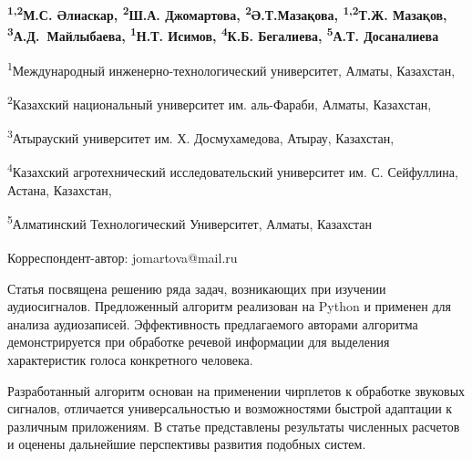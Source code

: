 
\begin{articleheader}

{\bfseries
\textsuperscript{1,2}М.С. Әлиаскар,
\textsuperscript{2}Ш.А. Джомартова\textsuperscript{\envelope },
\textsuperscript{2}Ә.Т.Мазақова,
\textsuperscript{1,2}Т.Ж. Мазақов,
\textsuperscript{3}А.Д.~Майлыбаева,
\textsuperscript{1}Н.Т. Исимов,
\textsuperscript{4}К.Б. Бегалиева,
\textsuperscript{5}А.Т. Досаналиева
}
\end{articleheader}

\begin{affiliation}
\textsuperscript{1}Международный инженерно-технологический университет, Алматы, Казахстан,

\textsuperscript{2}Казахский национальный университет им. аль-Фараби, Алматы, Казахстан,

\textsuperscript{3}Атырауский университет им. Х. Досмухамедова, Атырау, Казахстан,

\textsuperscript{4}Казахский агротехнический исследовательский университет им. С. Сейфуллина, Астана, Казахстан,

\textsuperscript{5}Алматинский Технологический Университет, Алматы, Казахстан

\raggedright \textsuperscript{\envelope } Корреспондент-автор: jomartova@mail.ru
\end{affiliation}

Статья посвящена решению ряда задач, возникающих при изучении
аудиосигналов. Предложенный алгоритм реализован на Python и применен для
анализа аудиозаписей. Эффективность предлагаемого авторами алгоритма
демонстрируется при обработке речевой информации для выделения
характеристик голоса конкретного человека.

Разработанный алгоритм основан на применении чирплетов к обработке
звуковых сигналов, отличается универсальностью и возможностями быстрой
адаптации к различным приложениям. В статье представлены результаты
численных расчетов и оценены дальнейшие перспективы развития подобных
систем.

